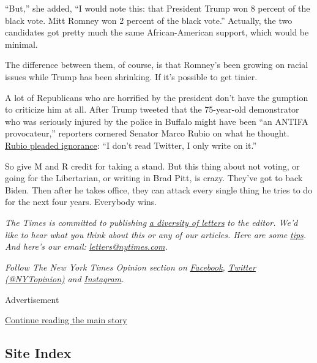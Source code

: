 ``But,'' she added, ``I would note this: that President Trump won 8
percent of the black vote. Mitt Romney won 2 percent of the black
vote.'' Actually, the two candidates got pretty much the same
African-American support, which would be minimal.

The difference between them, of course, is that Romney's been growing on
racial issues while Trump has been shrinking. If it's possible to get
tinier.

A lot of Republicans who are horrified by the president don't have the
gumption to criticize him at all. After Trump tweeted that the
75-year-old demonstrator who was seriously injured by the police in
Buffalo might have been ``an ANTIFA provocateur,'' reporters cornered
Senator Marco Rubio on what he thought.
\href{https://www.cnn.com/2020/06/09/politics/trump-buffalo-protester-set-up-tweet/index.html}{Rubio
pleaded ignorance}: ``I don't read Twitter, I only write on it.''

So give M and R credit for taking a stand. But this thing about not
voting, or going for the Libertarian, or writing in Brad Pitt, is crazy.
They've got to back Biden. Then after he takes office, they can attack
every single thing he tries to do for the next four years. Everybody
wins.

\emph{The Times is committed to publishing}
\href{https://www.nytimes.com/2019/01/31/opinion/letters/letters-to-editor-new-york-times-women.html}{\emph{a
diversity of letters}} \emph{to the editor. We'd like to hear what you
think about this or any of our articles. Here are some}
\href{https://help.nytimes.com/hc/en-us/articles/115014925288-How-to-submit-a-letter-to-the-editor}{\emph{tips}}\emph{.
And here's our email:}
\href{mailto:letters@nytimes.com}{\emph{letters@nytimes.com}}\emph{.}

\emph{Follow The New York Times Opinion section on}
\href{https://www.facebook.com/nytopinion}{\emph{Facebook}}\emph{,}
\href{http://twitter.com/NYTOpinion}{\emph{Twitter (@NYTopinion)}}
\emph{and}
\href{https://www.instagram.com/nytopinion/}{\emph{Instagram}}\emph{.}

Advertisement

\protect\hyperlink{after-bottom}{Continue reading the main story}

\hypertarget{site-index}{%
\subsection{Site Index}\label{site-index}}

